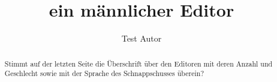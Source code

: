\documentclass{snapshotmfo}
\author{Test Autor}
\title{ein männlicher Editor}
\begin{document}
\begin{abstract}
Stimmt auf der letzten Seite die Überschrift über den Editoren mit deren Anzahl und Geschlecht sowie mit 
der Sprache des Schnappschusses überein?
\end{abstract}
\end{document}
